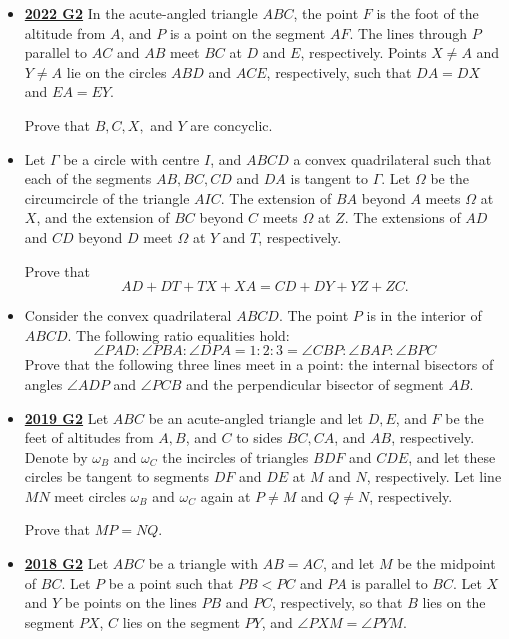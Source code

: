 \documentclass[11pt]{scrartcl}
\begin{document}
\begin{itemize}[leftmargin=*]
Prove that $E$ lies on $\omega$.
\item  \href{https://artofproblemsolving.com/community/c6h3107329p28104258}{\textbf{2022 G2}} In the acute-angled triangle $ABC$, the point $F$ is the foot of the altitude from $A$, and $P$ is a point on the segment $AF$. The lines through $P$ parallel to $AC$ and $AB$ meet $BC$ at $D$ and $E$, respectively. Points $X \ne A$ and $Y \ne A$ lie on the circles $ABD$ and $ACE$, respectively, such that $DA = DX$ and $EA = EY$. 

Prove that $B, C, X,$ and $Y$ are concyclic.
\item {}  Let $\Gamma$ be a circle with centre $I$, and $A B C D$ a convex quadrilateral such that each of the segments $A B, B C, C D$ and $D A$ is tangent to $\Gamma$. Let $\Omega$ be the circumcircle of the triangle $A I C$. The extension of $B A$ beyond $A$ meets $\Omega$ at $X$, and the extension of $B C$ beyond $C$ meets $\Omega$ at $Z$. The extensions of $A D$ and $C D$ beyond $D$ meet $\Omega$ at $Y$ and $T$, respectively. 

Prove that\[A D+D T+T X+X A=C D+D Y+Y Z+Z C.\]
\item {}  Consider the convex quadrilateral $ABCD$. The point $P$ is in the interior of $ABCD$. The following ratio equalities hold: \[\angle PAD:\angle PBA:\angle DPA=1:2:3=\angle CBP:\angle BAP:\angle BPC\]Prove that the following three lines meet in a point: the internal bisectors of angles $\angle ADP$ and $\angle PCB$ and the perpendicular bisector of segment $AB$.

\newpage

\item \href{https://artofproblemsolving.com/community/c6h2278992p17828685}{\textbf{2019 G2}} Let $ABC$ be an acute-angled triangle and let $D, E$, and $F$ be the feet of altitudes from $A, B$, and $C$ to sides $BC, CA$, and $AB$, respectively. Denote by $\omega_B$ and $\omega_C$ the incircles of triangles $BDF$ and $CDE$, and let these circles be tangent to segments $DF$ and $DE$ at $M$ and $N$, respectively. Let line $MN$ meet circles $\omega_B$ and $\omega_C$ again at $P \ne M$ and $Q \ne N$, respectively. 

Prove that $MP = NQ$.




\item \href{https://artofproblemsolving.com/community/c6h1876755p12752806}{\textbf{2018 G2}} Let $ABC$ be a triangle with $AB=AC$, and let $M$ be the midpoint of $BC$. Let $P$ be a point such that $PB<PC$ and $PA$ is parallel to $BC$. Let $X$ and $Y$ be points on the lines $PB$ and $PC$, respectively, so that $B$ lies on the segment $PX$, $C$ lies on the segment $PY$, and $\angle PXM=\angle PYM$. 


\end{itemize}
\end{document}
